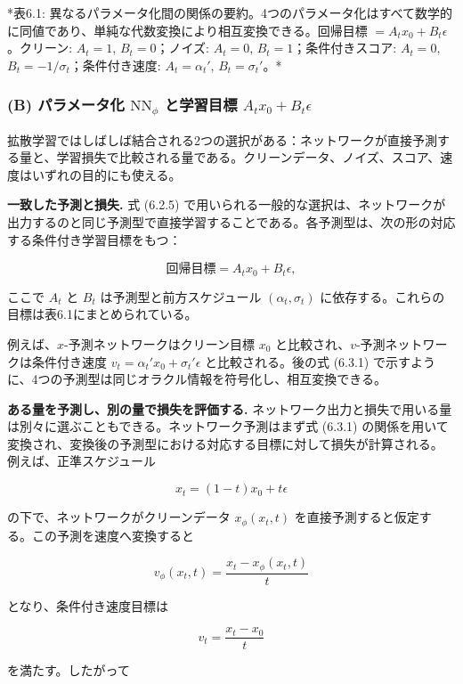 

*表6.1: 異なるパラメータ化間の関係の要約。4つのパラメータ化はすべて数学的に同値であり、単純な代数変換により相互変換できる。回帰目標 $= A_t x_0 + B_t\epsilon$。クリーン: $A_t=1$, $B_t=0$；ノイズ: $A_t=0$, $B_t=1$；条件付きスコア: $A_t=0$, $B_t=-1/\sigma_t$；条件付き速度: $A_t=\alpha_t'$, $B_t=\sigma_t'$。*

\subsubsection*{(B) パラメータ化 $\mathrm{NN}_\phi$ と学習目標 $A_t x_0 + B_t\epsilon$}


拡散学習ではしばしば結合される2つの選択がある：ネットワークが直接予測する量と、学習損失で比較される量である。クリーンデータ、ノイズ、スコア、速度はいずれの目的にも使える。

\textbf{一致した予測と損失.} 式 (6.2.5) で用いられる一般的な選択は、ネットワークが出力するのと同じ予測型で直接学習することである。各予測型は、次の形の対応する条件付き学習目標をもつ：

\[
\text{回帰目標} = A_t x_0 + B_t\epsilon,
\]


ここで $A_t$ と $B_t$ は予測型と前方スケジュール $(\alpha_t, \sigma_t)$ に依存する。これらの目標は表6.1にまとめられている。

例えば、$x$-予測ネットワークはクリーン目標 $x_0$ と比較され、$v$-予測ネットワークは条件付き速度 $v_t = \alpha_t' x_0 + \sigma_t' \epsilon$ と比較される。後の式 (6.3.1) で示すように、4つの予測型は同じオラクル情報を符号化し、相互変換できる。

\textbf{ある量を予測し、別の量で損失を評価する.} ネットワーク出力と損失で用いる量は別々に選ぶこともできる。ネットワーク予測はまず式 (6.3.1) の関係を用いて変換され、変換後の予測型における対応する目標に対して損失が計算される。
例えば、正準スケジュール

\[
x_t = (1-t)x_0 + t\epsilon
\]


の下で、ネットワークがクリーンデータ $x_\phi(x_t, t)$ を直接予測すると仮定する。この予測を速度へ変換すると

\[
v_\phi(x_t, t) = \frac{x_t - x_\phi(x_t, t)}{t}
\]


となり、条件付き速度目標は

\[
v_t = \frac{x_t - x_0}{t}
\]


を満たす。したがって

